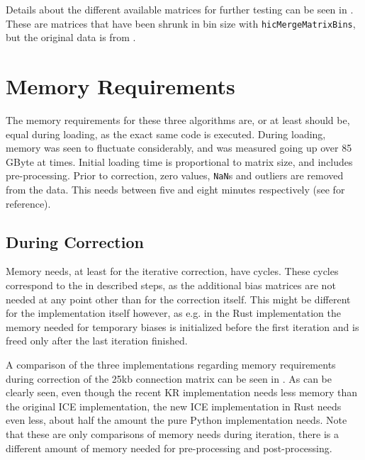 
Details about the different available matrices for further testing can be seen
in . These are matrices that have been shrunk in bin size
with \verb|hicMergeMatrixBins|, but the original data is from \cite{rao20143d}.







\section{Memory Requirements}\label{sec:memory}

The memory requirements for these three algorithms are, or at least should be,
equal during loading, as the exact same code is executed. During loading,
memory was seen to fluctuate considerably, and was measured going up over 85
GByte at times. Initial loading time is proportional to matrix size, and
includes pre-processing. Prior to correction, zero values, \verb|NaN|s and
outliers are removed from the data. This needs between five and eight minutes
respectively (see  for reference).


\newpage
\subsection{During Correction}\label{sec:itermem}

Memory needs, at least for the iterative correction, have cycles. These cycles
correspond to the in  described steps, as the additional bias
matrices are not needed at any point other than for the correction itself. This
might be different for the implementation itself however, as e.g. in the Rust
implementation the memory needed for temporary biases is initialized before the
first iteration and is freed only after the last iteration finished.

A comparison of the three implementations regarding memory requirements during
correction of the 25kb connection matrix can be seen in .
As can be clearly seen, even though the recent KR implementation needs less
memory than the original ICE implementation, the new ICE implementation in Rust
needs even less, about half the amount the pure Python implementation needs.
Note that these are only comparisons of memory needs during iteration, there is
a different amount of memory needed for pre-processing and post-processing. 

